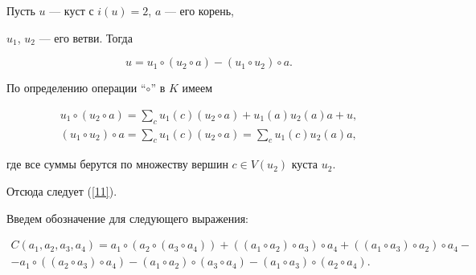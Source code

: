 \begin{lem} Пусть $u$ --- куст с $i(u)=2$, $a$ --- его корень,


$u_1$, $u_2$ --- его ветви. Тогда


\begin{equation}\label{11}


u=u_1 \circ (u_2 \circ a)-(u_1 \circ u_2) \circ a.


\end{equation}


\end{lem}





\begin{pf} По определению операции ``$\circ$'' в $K$ имеем


\begin{gather*}


u_1 \circ (u_2 \circ a)=\sum _cu_1(c)(u_2 \circ


 a)+u_1(a)u_2(a)a+u,\\


(u_1 \circ u_2) \circ a=\sum _cu_1(c)(u_2 \circ a)=\sum _cu_1(c)


u_2(a)a,


\end{gather*}


где все суммы берутся по множеству вершин $c\in V(u_2)$ куста $u_2$.


Отсюда следует (\ref{11}).


\end{pf}





Введем обозначение для следующего выражения:


\begin{multline*}


C(a_1,a_2,a_3,a_4)=a_1 \circ (a_2 \circ (a_3 \circ a_4))+


((a_1 \circ a_2) \circ a_3) \circ a_4 +((a_1 \circ a_3) \circ 


a_2) \circ a_4 -\\


%


-a_1 \circ ((a_2 \circ a_3) \circ a_4)-


(a_1 \circ a_2) \circ (a_3 \circ a_4)-(a_1 \circ a_3) \circ 


(a_2 \circ a_4).


\end{multline*}





